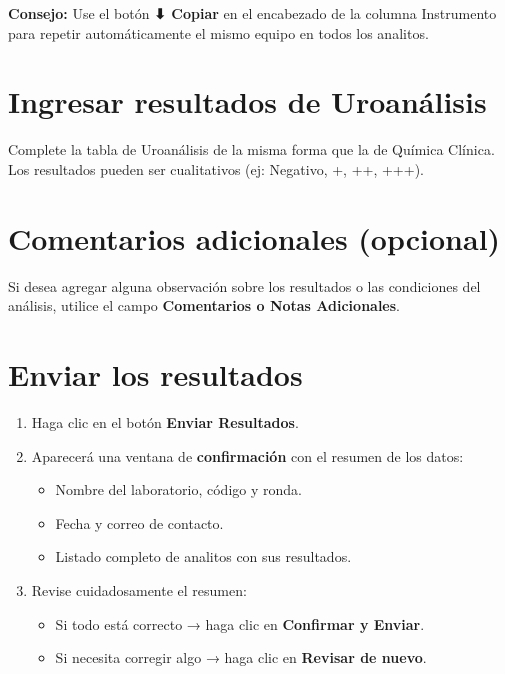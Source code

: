 \documentclass[12pt, letterpaper]{article}
\begin{document}
\begin{cajainfo}
\textbf{Consejo:} Use el botón \textbf{⬇ Copiar} en el encabezado de la columna Instrumento para repetir automáticamente el mismo equipo en todos los analitos.
\end{cajainfo}

\section{Ingresar resultados de Uroanálisis}

Complete la tabla de Uroanálisis de la misma forma que la de Química Clínica. Los resultados pueden ser cualitativos (ej: Negativo, +, ++, +++).

\section{Comentarios adicionales (opcional)}

Si desea agregar alguna observación sobre los resultados o las condiciones del análisis, utilice el campo \textbf{Comentarios o Notas Adicionales}.

\section{Enviar los resultados}

\begin{enumerate}[leftmargin=1.5em]
  \item Haga clic en el botón \textbf{Enviar Resultados}.
  \item Aparecerá una ventana de \textbf{confirmación} con el resumen de los datos:
    \begin{itemize}
      \item Nombre del laboratorio, código y ronda.
      \item Fecha y correo de contacto.
      \item Listado completo de analitos con sus resultados.
    \end{itemize}
  \item Revise cuidadosamente el resumen:
    \begin{itemize}
      \item Si todo está correcto → haga clic en \textbf{Confirmar y Enviar}.
      \item Si necesita corregir algo → haga clic en \textbf{Revisar de nuevo}.
    \end{itemize}
\end{enumerate}
\end{document}
